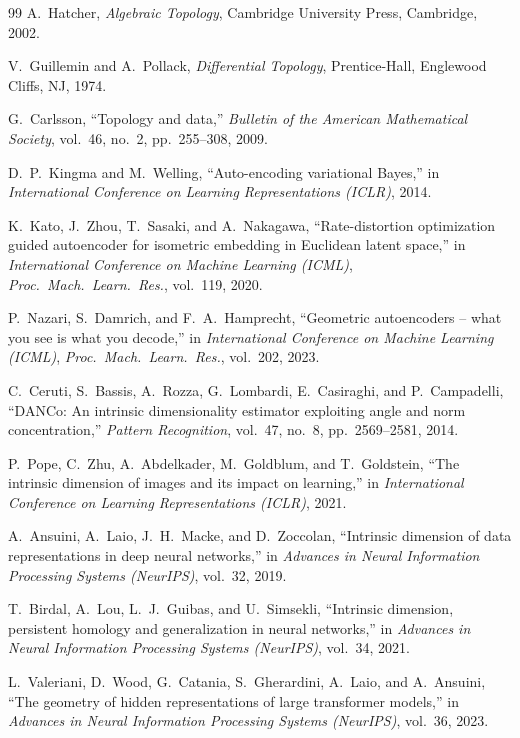 \documentclass[11pt,a4paper]{jsarticle}
\begin{document}
\begin{thebibliography}{99}
A.~Hatcher,
\textit{Algebraic Topology},
Cambridge University Press, Cambridge, 2002.

V.~Guillemin and A.~Pollack,
\textit{Differential Topology},
Prentice-Hall, Englewood Cliffs, NJ, 1974.

G.~Carlsson,
``Topology and data,''
\textit{Bulletin of the American Mathematical Society},
vol.~46, no.~2, pp.~255--308, 2009.

D.~P.~Kingma and M.~Welling,
``Auto-encoding variational Bayes,''
in \textit{International Conference on Learning Representations (ICLR)}, 2014.

K.~Kato, J.~Zhou, T.~Sasaki, and A.~Nakagawa,
``Rate-distortion optimization guided autoencoder for isometric embedding
in Euclidean latent space,''
in \textit{International Conference on Machine Learning (ICML)},
\textit{Proc.~Mach.~Learn.~Res.}, vol.~119, 2020.

P.~Nazari, S.~Damrich, and F.~A.~Hamprecht,
``Geometric autoencoders -- what you see is what you decode,''
in \textit{International Conference on Machine Learning (ICML)},
\textit{Proc.~Mach.~Learn.~Res.}, vol.~202, 2023.

C.~Ceruti, S.~Bassis, A.~Rozza, G.~Lombardi, E.~Casiraghi, and P.~Campadelli,
``DANCo: An intrinsic dimensionality estimator exploiting angle and norm concentration,''
\textit{Pattern Recognition}, vol.~47, no.~8, pp.~2569--2581, 2014.

P.~Pope, C.~Zhu, A.~Abdelkader, M.~Goldblum, and T.~Goldstein,
``The intrinsic dimension of images and its impact on learning,''
in \textit{International Conference on Learning Representations (ICLR)}, 2021.

A.~Ansuini, A.~Laio, J.~H.~Macke, and D.~Zoccolan,
``Intrinsic dimension of data representations in deep neural networks,''
in \textit{Advances in Neural Information Processing Systems (NeurIPS)},
vol.~32, 2019.

T.~Birdal, A.~Lou, L.~J.~Guibas, and U.~Simsekli,
``Intrinsic dimension, persistent homology and generalization
in neural networks,''
in \textit{Advances in Neural Information Processing Systems (NeurIPS)},
vol.~34, 2021.

L.~Valeriani, D.~Wood, G.~Catania, S.~Gherardini, A.~Laio, and A.~Ansuini,
``The geometry of hidden representations of large transformer models,''
in \textit{Advances in Neural Information Processing Systems (NeurIPS)},
vol.~36, 2023.


\end{thebibliography}
\end{document}

